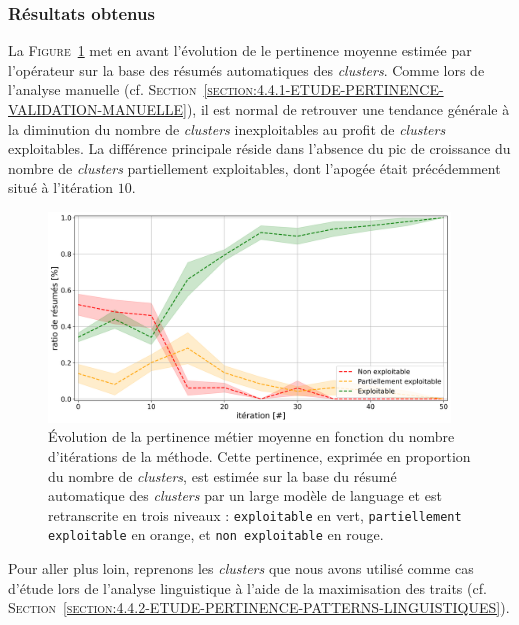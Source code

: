 		\subsubsection{Résultats obtenus}
		
			La \textsc{Figure~\ref{figure:4.4.3-ETUDE-PERTINENCE-RESUME-AUTOMATIQUE}} met en avant l'évolution de le pertinence moyenne estimée par l'opérateur
			sur la base des résumés automatiques des \textit{clusters}.
			Comme lors de l'analyse manuelle (cf. \textsc{Section~\ref{section:4.4.1-ETUDE-PERTINENCE-VALIDATION-MANUELLE}}), il est normal de retrouver une tendance générale à la diminution du nombre de \textit{clusters} inexploitables au profit de \textit{clusters} exploitables.
			La différence principale réside dans l'absence du pic de croissance du nombre de \textit{clusters} partiellement exploitables, dont l'apogée était précédemment situé à l'itération $10$.
			
			\begin{figure}[!htb]
				\centering
				\includegraphics[width=0.95\textwidth]{figures/etude-pertinence-llm-check-resume-annotation-favori}
				\caption{
					Évolution de la pertinence métier moyenne en fonction du nombre d'itérations de la méthode.
					Cette pertinence, exprimée en proportion du nombre de \textit{clusters}, est estimée sur la base du résumé automatique des \textit{clusters} par un large modèle de language et est retranscrite en trois niveaux : \texttt{exploitable} en vert, \texttt{partiellement exploitable} en orange, et \texttt{non exploitable} en rouge.
				}
				\label{figure:4.4.3-ETUDE-PERTINENCE-RESUME-AUTOMATIQUE}
			\end{figure}
			
			Pour aller plus loin, reprenons les \textit{clusters} que nous avons utilisé comme cas d'étude lors de l'analyse linguistique à l'aide de la maximisation des traits (cf. \textsc{Section~\ref{section:4.4.2-ETUDE-PERTINENCE-PATTERNS-LINGUISTIQUES}}).
			
